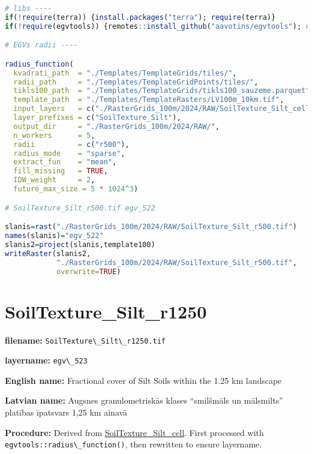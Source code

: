 \documentclass[
]{book}
\newcommand{\passthrough}[1]{#1}
\begin{document}
\begin{lstlisting}[language=R]
# libs ----
if(!require(terra)) {install.packages("terra"); require(terra)}
if(!require(egvtools)) {remotes::install_github("aavotins/egvtools"); require(egvtools)}

# EGVs radii ----

radius_function(
  kvadrati_path  = "./Templates/TemplateGrids/tiles/",
  radii_path     = "./Templates/TemplateGridPoints/tiles/",
  tikls100_path  = "./Templates/TemplateGrids/tikls100_sauzeme.parquet",
  template_path  = "./Templates/TemplateRasters/LV100m_10km.tif",
  input_layers   = c("./RasterGrids_100m/2024/RAW/SoilTexture_Silt_cell.tif"),
  layer_prefixes = c("SoilTexture_Silt"),
  output_dir     = "./RasterGrids_100m/2024/RAW/",
  n_workers      = 5,
  radii          = c("r500"),
  radius_mode    = "sparse",
  extract_fun    = "mean",
  fill_missing   = TRUE,
  IDW_weight     = 2,
  future_max_size = 5 * 1024^3)

# SoilTexture_Silt_r500.tif egv_522

slanis=rast("./RasterGrids_100m/2024/RAW/SoilTexture_Silt_r500.tif")
names(slanis)="egv_522"
slanis2=project(slanis,template100)
writeRaster(slanis2,
            "./RasterGrids_100m/2024/RAW/SoilTexture_Silt_r500.tif",
            overwrite=TRUE)
\end{lstlisting}

\section{SoilTexture\_Silt\_r1250}\label{ch06.523}

\textbf{filename:} \passthrough{\lstinline!SoilTexture\_Silt\_r1250.tif!}

\textbf{layername:} \passthrough{\lstinline!egv\_523!}

\textbf{English name:} Fractional cover of Silt Soils within the 1.25 km landscape

\textbf{Latvian name:} Augsnes granulometriskās klases ``smilšmāls un mālsmilts'' platības īpatsvars 1,25 km ainavā

\textbf{Procedure:} Derived from \hyperref[ch06.521]{SoilTexture\_Silt\_cell}. First processed
with \passthrough{\lstinline!egvtools::radius\_function()!}, then rewritten to ensure layername.
\end{document}
